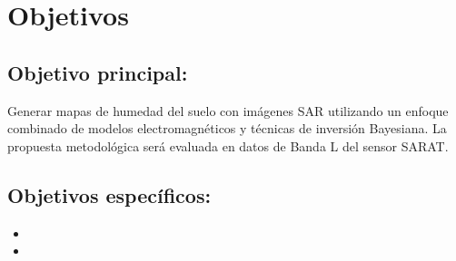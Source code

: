 \section*{Objetivos}
\label{sec:objetivos}


\subsection*{Objetivo principal:}
Generar mapas de humedad del suelo con imágenes SAR utilizando un enfoque combinado de modelos electromagnéticos y técnicas de inversión Bayesiana. La propuesta metodológica será evaluada en datos de Banda L del sensor SARAT. \\


\subsection*{Objetivos específicos:}

\begin{itemize}
 \item 
 \item 
\end{itemize}